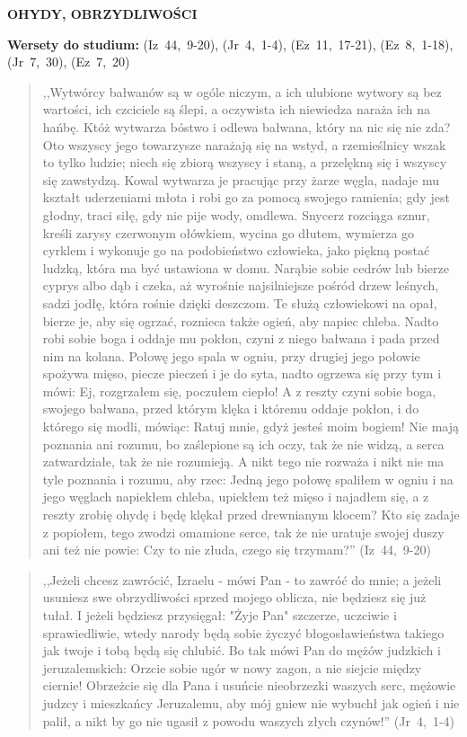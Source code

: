 \documentclass[10pt,a4paper,oneside]{article}
\begin{document}
\centerline{\textbf{\MakeUppercase{Ohydy, obrzydliwości}}}
\begin{center}
\textbf{Wersety do studium:} (Iz~44,~9-20), (Jr~4,~1-4), (Ez~11,~17-21), (Ez~8,~1-18), (Jr~7,~30), (Ez~7,~20)
\end{center}
\begin{quote}
,,Wytwórcy bałwanów są w ogóle niczym, a ich ulubione wytwory są bez wartości, ich czciciele są ślepi, a oczywista ich niewiedza naraża ich na hańbę. Któż wytwarza bóstwo i odlewa bałwana, który na nic się nie zda? Oto wszyscy jego towarzysze narażają się na wstyd, a rzemieślnicy wszak to tylko ludzie; niech się zbiorą wszyscy i staną, a przelękną się i wszyscy się zawstydzą. Kowal wytwarza je pracując przy żarze węgla, nadaje mu kształt uderzeniami młota i robi go za pomocą swojego ramienia; gdy jest głodny, traci siłę, gdy nie pije wody, omdlewa. Snycerz rozciąga sznur, kreśli zarysy czerwonym ołówkiem, wycina go dłutem, wymierza go cyrklem i wykonuje go na podobieństwo człowieka, jako piękną postać ludzką, która ma być ustawiona w domu. Narąbie sobie cedrów lub bierze cyprys albo dąb i czeka, aż wyrośnie najsilniejsze pośród drzew leśnych, sadzi jodłę, która rośnie dzięki deszczom. Te służą człowiekowi na opał, bierze je, aby się ogrzać, roznieca także ogień, aby napiec chleba. Nadto robi sobie boga i oddaje mu pokłon, czyni z niego bałwana i pada przed nim na kolana. Połowę jego spala w ogniu, przy drugiej jego połowie spożywa mięso, piecze pieczeń i je do syta, nadto ogrzewa się przy tym i mówi: Ej, rozgrzałem się, poczułem ciepło! A z reszty czyni sobie boga, swojego bałwana, przed którym klęka i któremu oddaje pokłon, i do którego się modli, mówiąc: Ratuj mnie, gdyż jesteś moim bogiem! Nie mają poznania ani rozumu, bo zaślepione są ich oczy, tak że nie widzą, a serca zatwardziałe, tak że nie rozumieją. A nikt tego nie rozważa i nikt nie ma tyle poznania i rozumu, aby rzec: Jedną jego połowę spaliłem w ogniu i na jego węglach napiekłem chleba, upiekłem też mięso i najadłem się, a z reszty zrobię ohydę i będę klękał przed drewnianym klocem? Kto się zadaje z popiołem, tego zwodzi omamione serce, tak że nie uratuje swojej duszy ani też nie powie: Czy to nie złuda, czego się trzymam?'' (Iz~44,~9-20)
\end{quote}
\begin{quote}
,,Jeżeli chcesz zawrócić, Izraelu - mówi Pan - to zawróć do mnie; a jeżeli usuniesz swe obrzydliwości sprzed mojego oblicza, nie będziesz się już tułał. I jeżeli będziesz przysięgał: "Żyje Pan" szczerze, uczciwie i sprawiedliwie, wtedy narody będą sobie życzyć błogosławieństwa takiego jak twoje i tobą będą się chlubić. Bo tak mówi Pan do mężów judzkich i jeruzalemskich: Orzcie sobie ugór w nowy zagon, a nie siejcie między ciernie! Obrzeżcie się dla Pana i usuńcie nieobrzezki waszych serc, mężowie judzcy i mieszkańcy Jeruzalemu, aby mój gniew nie wybuchł jak ogień i nie palił, a nikt by go nie ugasił z powodu waszych złych czynów!'' (Jr~4,~1-4)
\end{quote}
\end{document}
